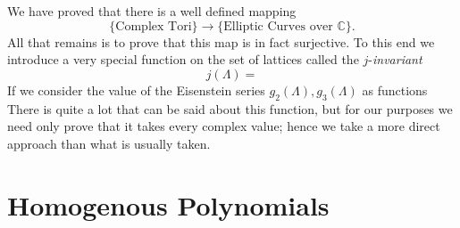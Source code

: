 \documentclass{article}
\theoremstyle{remark}
\begin{document}
We have proved that there is a well defined mapping
\[\{\text{Complex Tori}\} \longrightarrow \{\text{Elliptic Curves over }\mathbb{C} \}.\]
All that remains is to prove that this map is in fact surjective. To this end we introduce a very special function on the set of lattices called the $j$-\textit{invariant}
\[j(\Lambda)=\]
 If we consider the value of the Eisenstein series $g_2(\Lambda),g_3(\Lambda)$ as functions 
There is quite a lot that can be said about this function, but for our purposes we need only prove that it takes every complex value; hence we take a more direct approach than what is usually taken.








\appendix 
\section{Homogenous Polynomials}
\end{document}

